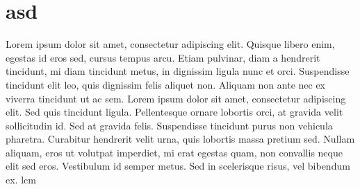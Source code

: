 \chapter{asd}
Lorem ipsum dolor sit amet, consectetur adipiscing elit. Quisque libero enim, egestas id eros sed, cursus tempus arcu. Etiam pulvinar, diam a hendrerit tincidunt, mi diam tincidunt metus, in dignissim ligula nunc et orci. Suspendisse tincidunt elit leo, quis dignissim felis aliquet non. Aliquam non ante nec ex viverra tincidunt ut ac sem. Lorem ipsum dolor sit amet, consectetur adipiscing elit. Sed quis tincidunt ligula. Pellentesque ornare lobortis orci, at gravida velit sollicitudin id. Sed at gravida felis. Suspendisse tincidunt purus non vehicula pharetra. Curabitur hendrerit velit urna, quis lobortis massa pretium sed. Nullam aliquam, eros ut volutpat imperdiet, mi erat egestas quam, non convallis neque elit sed eros. Vestibulum id semper metus. Sed in scelerisque risus, vel bibendum ex.	
\acrshort{lcm}